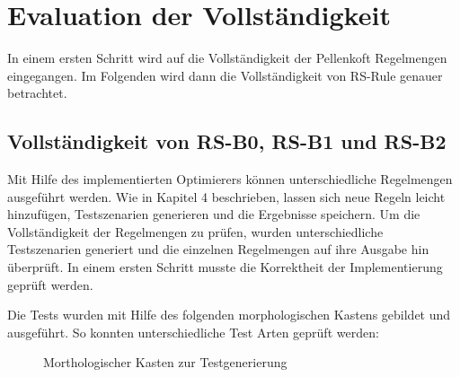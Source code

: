 \section{Evaluation der Vollständigkeit}

In einem ersten Schritt wird auf die Vollständigkeit der Pellenkoft Regelmengen eingegangen. Im Folgenden wird dann die Vollständigkeit von RS-Rule genauer betrachtet.

\subsection{Vollständigkeit von RS-B0, RS-B1 und RS-B2}

Mit Hilfe des implementierten Optimierers können unterschiedliche Regelmengen ausgeführt werden. Wie in Kapitel 4 beschrieben, lassen sich neue Regeln leicht hinzufügen, Testszenarien generieren und die Ergebnisse speichern. Um die Vollständigkeit der Regelmengen zu prüfen, wurden unterschiedliche Testszenarien generiert und die einzelnen Regelmengen auf ihre Ausgabe hin überprüft. In einem ersten Schritt musste die Korrektheit der Implementierung geprüft werden.

Die Tests wurden mit Hilfe des folgenden morphologischen Kastens gebildet und ausgeführt. So konnten unterschiedliche Test Arten geprüft werden:

\begin{figure}[ht]
\centering
{}
\caption{Morthologischer Kasten zur Testgenerierung}
\label{my-label}
\end{figure}

